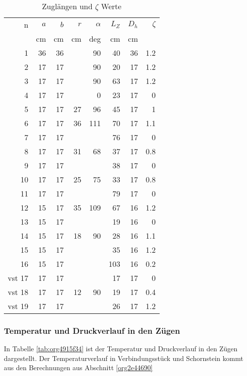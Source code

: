 \documentclass[a4paper,10pt,twoside]{article}
\begin{document}
\begin{table}[htbp]
\caption{\label{tab:org2c3ac42}
Zuglängen und \(\zeta\) Werte}
\centering
\begin{tabular}{rrrrrrrr}
n & \(a\) & \(b\) & \(r\) & \(\alpha\) & \(L_Z\) & \(D_h\) & \(\zeta\)\\
 & cm & cm & cm & deg & cm & cm & \\
\hline
1 & 36 & 36 &  & 90 & 40 & 36 & 1.2\\
2 & 17 & 17 &  & 90 & 20 & 17 & 1.2\\
3 & 17 & 17 &  & 90 & 63 & 17 & 1.2\\
4 & 17 & 17 &  & 0 & 23 & 17 & 0\\
5 & 17 & 17 & 27 & 96 & 45 & 17 & 1\\
6 & 17 & 17 & 36 & 111 & 70 & 17 & 1.1\\
7 & 17 & 17 &  &  & 76 & 17 & 0\\
8 & 17 & 17 & 31 & 68 & 37 & 17 & 0.8\\
9 & 17 & 17 &  &  & 38 & 17 & 0\\
10 & 17 & 17 & 25 & 75 & 33 & 17 & 0.8\\
11 & 17 & 17 &  &  & 79 & 17 & 0\\
12 & 15 & 17 & 35 & 109 & 67 & 16 & 1.2\\
13 & 15 & 17 &  &  & 19 & 16 & 0\\
14 & 15 & 17 & 18 & 90 & 28 & 16 & 1.1\\
15 & 15 & 17 &  &  & 35 & 16 & 1.2\\
16 & 15 & 17 &  &  & 103 & 16 & 0.2\\
vst 17 & 17 & 17 &  &  & 17 & 17 & 0\\
vst 18 & 17 & 17 & 12 & 90 & 19 & 17 & 0.4\\
vst 19 & 17 & 17 &  &  & 26 & 17 & 1.2\\
\end{tabular}
\end{table}

\subsubsection{Temperatur und Druckverlauf in den Zügen}
\label{sec:org8cc22b1}
In Tabelle \ref{tab:org4915f34} ist der Temperatur und Druckverlauf in den Zügen dargestellt.
Der Temperaturverlauf in Verbindungsstück und Schornstein kommt aus den Berechnungen 
aus Abschnitt \ref{org2e44690}
\end{document}
